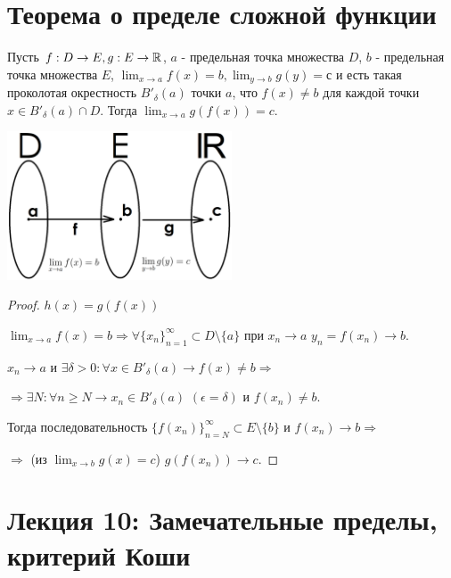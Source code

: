 	\section{Теорема о пределе сложной функции}
	
	\begin{theorem}
		Пусть $f : D \rightarrow E, g : E \rightarrow \mathbb R$, $a$ - предельная точка множества
		$D$, $b$ - предельная точка множества $E$, $\lim_{x \to a} f(x) = b, \lim_{y \to b} g(y) = с$ и есть такая проколотая окрестность $B'_{\delta}(a)$ точки $a$, что $f(x) \neq b$ для каждой точки $x \in B'_{\delta}(a) \cap D.$ Тогда $\lim_{x \to a} g(f(x)) = c.$
	\end{theorem}
	
	\begin{center}
		\includegraphics[width=0.5\textwidth]{img/lecture9/function_composition}
	\end{center}
	
	\begin{proof}
		$h(x) = g(f(x))$
		
		$\lim_{x \to a} f(x) = b \Rightarrow \forall \{x_n\}^{\infty}_{n = 1} \subset D \setminus \{a\}$ при $x_n \to a$ $y_n = f(x_n) \to b.$
		
		$x_n \to a$ и $\exists \delta > 0: \forall x \in B'_{\delta}(a) \to f(x) \neq b \Rightarrow$
		
		$\Rightarrow \exists N: \forall n \geqslant N \rightarrow x_n \in B'_{\delta}(a)$ $(\epsilon = \delta)$ и $f(x_n) \neq b.$
		
		Тогда последовательность $\{f(x_n)\}^{\infty}_{n = N} \subset E \setminus \{b\}$ и $f(x_n) \to b \Rightarrow$
		
		 $\Rightarrow$ (из $\lim_{x \to b} g(x) = c$) $g(f(x_n)) \to c.$
	\end{proof}
	
	\newpage	
	
	\section*{Лекция 10: Замечательные пределы, критерий Коши}
	

